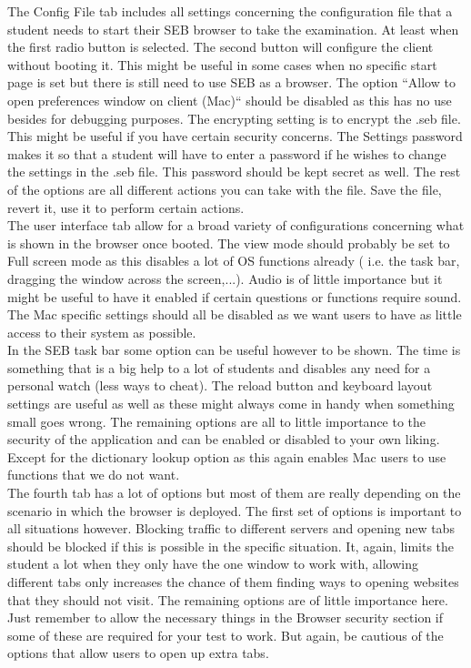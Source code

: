 The Config File tab includes all settings concerning the configuration file that a student needs to start their SEB browser to take the examination. At least when the first radio button is selected. The second button will configure the client without booting it. This might be useful in some cases when no specific start page is set but there is still need to use SEB as a browser.
The option ``Allow to open preferences window on client (Mac)`` should be disabled as this has no use besides for debugging purposes. The encrypting setting is to encrypt the .seb file. This might be useful if you have certain security concerns. The Settings password makes it so that a student will have to enter a password if he wishes to change the settings in the .seb file. This password should be kept secret as well. The rest of the options are all different actions you can take with the file. Save the file, revert it, use it to perform certain actions.\\

The user interface tab allow for a broad variety of configurations concerning what is shown in the browser once booted. The view mode should probably be set to Full screen mode as this disables a lot of OS functions already ( i.e. the task bar, dragging the window across the screen,...). Audio is of little importance but it might be useful to have it enabled if certain questions or functions require sound. The Mac specific settings should all be disabled as we want users to have as little access to their system as possible.\\

 In the SEB task bar some option can be useful however to be shown. The time is something that is a big help to a lot of students and disables any need for a personal watch (less ways to cheat). The reload button and keyboard layout settings are useful as well as these might always come in handy when something small goes wrong. The remaining options are all to little importance to the security of the application and can be enabled or disabled to your own liking. Except for the dictionary lookup option as this again enables Mac users to use functions that we do not want.\\

The fourth tab has a lot of options but most of them are really depending on the scenario in which the browser is deployed. The first set of options is important to all situations however. Blocking traffic to different servers and opening new tabs should be blocked if this is possible in the specific situation.  It, again, limits the student a lot when they only have the one window to work with, allowing different tabs only increases the chance of them finding ways to opening websites that they should not visit. The remaining options are of little importance here. Just remember to allow the necessary things in the Browser security section if some of these are required for your test to work. But again, be cautious of the options that allow users to open up extra tabs.\\

